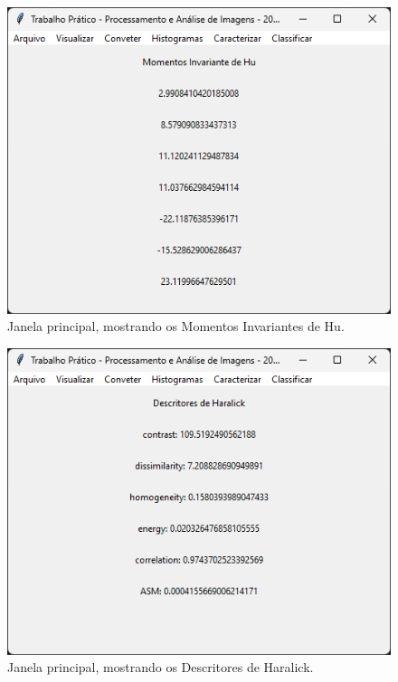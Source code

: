\documentclass[12pt]{article}
\begin{document}
\begin{figure}
    \centering
    \includegraphics{Captura de tela 2024-06-16 215855.png}
    \caption{Janela principal, mostrando os Momentos Invariantes de Hu.}
    \label{fig:janela-principal-momentos-invariante-hu}
\end{figure}

\begin{figure}
    \centering
    \includegraphics{Captura de tela 2024-06-16 215907.png}
    \caption{Janela principal, mostrando os Descritores de Haralick.}
    \label{fig:janela-principal-descritores-haralick}
\end{figure}
\end{document}
